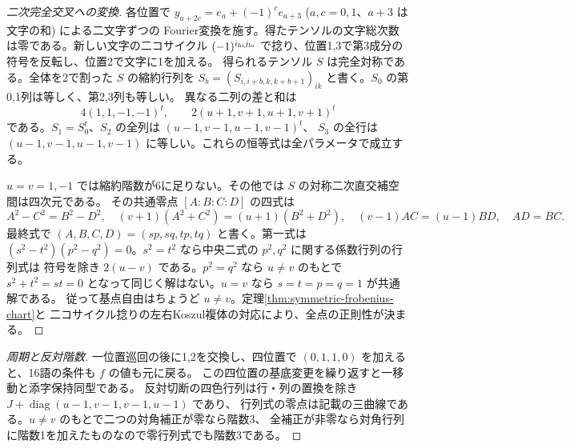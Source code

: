 \begin{proof}[二次完全交叉への変換]
各位置で $y_{a+2c}=e_a+(-1)^c e_{a+3}$ ($a,c=0,1$、$a+3$ は文字の和) による二文字ずつの
Fourier変換を施す。得たテンソルの文字総次数は零である。新しい文字の二コサイクル
$(-1)^{i_{\rm hi}j_{\rm lo}}$ で捻り、位置1,3で第3成分の符号を反転し、位置2で文字に1を加える。
得られるテンソル $S$ は完全対称である。全体を2で割った $S$ の縮約行列を
$S_b=(S_{i,i+b,k,k+b+1})_{ik}$ と書く。$S_0$ の第0,1列は等しく、第2,3列も等しい。
異なる二列の差と和は
\[
 4(1,1,-1,-1)^t,\qquad 2(u+1,v+1,u+1,v+1)^t
\]
である。$S_1=S_0^t$、$S_2$ の全列は $(u-1,v-1,u-1,v-1)^t$、
$S_3$ の全行は $(u-1,v-1,u-1,v-1)$ に等しい。これらの恒等式は全パラメータで成立する。

$u=v=1,-1$ では縮約階数が6に足りない。その他では $S$ の対称二次直交補空間は四次元である。
その共通零点 $[A:B:C:D]$ の四式は
\[
 A^2-C^2=B^2-D^2,\quad
 (v+1)(A^2+C^2)=(u+1)(B^2+D^2),\quad
 (v-1)AC=(u-1)BD,\quad AD=BC .
\]
最終式で $(A,B,C,D)=(sp,sq,tp,tq)$ と書く。第一式は
$(s^2-t^2)(p^2-q^2)=0$。$s^2=t^2$ なら中央二式の $p^2,q^2$ に関する係数行列の行列式は
符号を除き $2(u-v)$ である。$p^2=q^2$ なら $u\ne v$ のもとで
$s^2+t^2=st=0$ となって同じく解はない。$u=v$ なら $s=t=p=q=1$ が共通解である。
従って基点自由はちょうど $u\ne v$。定理\ref{thm:symmetric-frobenius-chart}と
二コサイクル捻りの左右Koszul複体の対応により、全点の正則性が決まる。
\end{proof}

\begin{proof}[周期と反対階数]
一位置巡回の後に1,2を交換し、四位置で $(0,1,1,0)$ を加えると、16語の条件も $f$ の値も元に戻る。
この四位置の基底変更を繰り返すと一移動と添字保持同型である。
反対切断の四色行列は行・列の置換を除き $J+\operatorname{diag}(u-1,v-1,v-1,u-1)$ であり、
行列式の零点は記載の三曲線である。$u\ne v$ のもとで二つの対角補正が零なら階数3、
全補正が非零なら対角行列に階数1を加えたものなので零行列式でも階数3である。
\end{proof}
